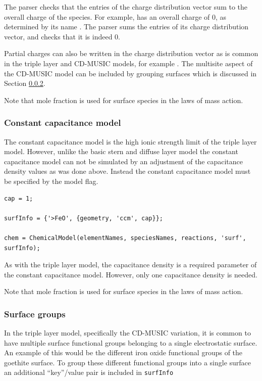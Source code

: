 \documentclass{article}
\begin{document}
The parser checks that the entries of the charge distribution vector sum to the overall charge of the species. For example,  has an overall charge of 0, as determined by its name . The parser sums the entries of its charge distribution vector, \mcode{[1 -1]} and checks that it is indeed 0. 

Partial charges can also be written in the charge distribution vector as is common in the triple layer and CD-MUSIC models, for example \mcode{[0.5 -1]}. The multisite aspect of the CD-MUSIC model can be included by grouping surfaces which is discussed in Section \ref{sec:groups}. 

Note that mole fraction is used for surface species in the laws of mass action. 

\subsubsection{Constant capacitance model}
The constant capacitance model is the high ionic strength limit of the triple layer model. However, unlike the basic stern and diffuse layer model the constant capacitance model can not be simulated by an adjustment of the capacitance density values as was done above. Instead the constant capacitance model must be specified by the  model flag.

\begin{lstlisting}
cap = 1;

surfInfo = {'>FeO', {geometry, 'ccm', cap}};

chem = ChemicalModel(elementNames, speciesNames, reactions, 'surf', surfInfo);
\end{lstlisting}
As with the triple layer model, the capacitance density is a required parameter of the constant capacitance model. However, only one capacitance density is needed. 

Note that mole fraction is used for surface species in the laws of mass action. 

\subsubsection{Surface groups}\label{sec:groups}
In the triple layer model, specifically the CD-MUSIC variation, it is common to have multiple surface functional groups belonging to a single electrostatic surface. An example of this would be the different iron oxide functional groups of the goethite surface. To group these different functional groups into a single surface an additional ``key''/value pair is included in \verb|surfInfo|
\end{document}
